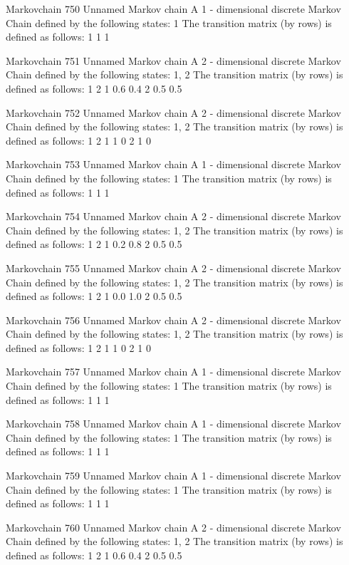 \documentclass[
  nojss]{jss}
\begin{document}
\begin{CodeChunk}
\begin{CodeOutput}
Markovchain  750 
Unnamed Markov chain 
 A  1 - dimensional discrete Markov Chain defined by the following states: 
 1 
 The transition matrix  (by rows)  is defined as follows: 
  1
1 1

Markovchain  751 
Unnamed Markov chain 
 A  2 - dimensional discrete Markov Chain defined by the following states: 
 1, 2 
 The transition matrix  (by rows)  is defined as follows: 
    1   2
1 0.6 0.4
2 0.5 0.5

Markovchain  752 
Unnamed Markov chain 
 A  2 - dimensional discrete Markov Chain defined by the following states: 
 1, 2 
 The transition matrix  (by rows)  is defined as follows: 
  1 2
1 1 0
2 1 0

Markovchain  753 
Unnamed Markov chain 
 A  1 - dimensional discrete Markov Chain defined by the following states: 
 1 
 The transition matrix  (by rows)  is defined as follows: 
  1
1 1

Markovchain  754 
Unnamed Markov chain 
 A  2 - dimensional discrete Markov Chain defined by the following states: 
 1, 2 
 The transition matrix  (by rows)  is defined as follows: 
    1   2
1 0.2 0.8
2 0.5 0.5

Markovchain  755 
Unnamed Markov chain 
 A  2 - dimensional discrete Markov Chain defined by the following states: 
 1, 2 
 The transition matrix  (by rows)  is defined as follows: 
    1   2
1 0.0 1.0
2 0.5 0.5

Markovchain  756 
Unnamed Markov chain 
 A  2 - dimensional discrete Markov Chain defined by the following states: 
 1, 2 
 The transition matrix  (by rows)  is defined as follows: 
  1 2
1 1 0
2 1 0

Markovchain  757 
Unnamed Markov chain 
 A  1 - dimensional discrete Markov Chain defined by the following states: 
 1 
 The transition matrix  (by rows)  is defined as follows: 
  1
1 1

Markovchain  758 
Unnamed Markov chain 
 A  1 - dimensional discrete Markov Chain defined by the following states: 
 1 
 The transition matrix  (by rows)  is defined as follows: 
  1
1 1

Markovchain  759 
Unnamed Markov chain 
 A  1 - dimensional discrete Markov Chain defined by the following states: 
 1 
 The transition matrix  (by rows)  is defined as follows: 
  1
1 1

Markovchain  760 
Unnamed Markov chain 
 A  2 - dimensional discrete Markov Chain defined by the following states: 
 1, 2 
 The transition matrix  (by rows)  is defined as follows: 
    1   2
1 0.6 0.4
2 0.5 0.5


\end{CodeOutput}
\end{CodeChunk}
\end{document}
